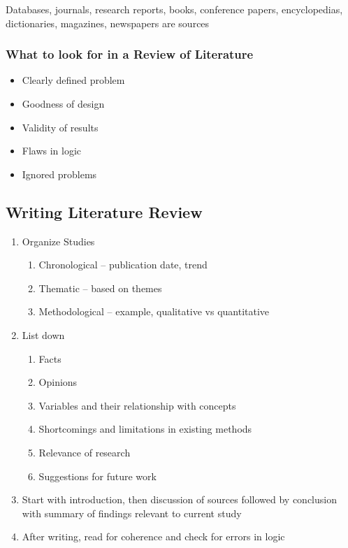 \documentclass{article}
\begin{document}
Databases, journals, research reports, books, conference papers, encyclopedias, dictionaries, magazines, newspapers are sources

\subsubsection{What to look for in a Review of Literature}

\begin{itemize}
    \item Clearly defined problem
    \item Goodness of design
    \item Validity of results
    \item Flaws in logic
    \item Ignored problems
\end{itemize}

\subsection{Writing Literature Review}

\begin{enumerate}
    \item Organize Studies
    \begin{enumerate}
        \item Chronological -- publication date, trend
        \item Thematic -- based on themes
        \item Methodological -- example, qualitative vs quantitative
    \end{enumerate}
    
    \item List down
    \begin{enumerate}
        \item Facts
        \item Opinions
        \item Variables and their relationship with concepts
        \item Shortcomings and limitations in existing methods
        \item Relevance of research
        \item Suggestions for future work
    \end{enumerate}
    
    \item Start with introduction, then discussion of sources followed by conclusion with summary of findings relevant to current study
    
    \item After writing, read for coherence and check for errors in logic
\end{enumerate}
\end{document}
